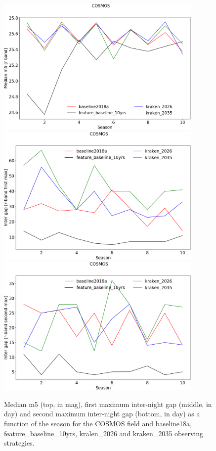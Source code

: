 \begin{figure}[htbp]
\begin{center}
  
  \includegraphics[width=10cm]{Figures/COSMOS_med_m5.png}
  \includegraphics[width=10cm]{Figures/COSMOS_intergap_max1.png}
    \includegraphics[width=10cm]{Figures/COSMOS_intergap_max2.png}
 \caption{Median m5 (top, in mag), first maximum inter-night gap (middle, in day) and second maximum inter-night gap (bottom, in day)  as a function of the season for the COSMOS field and baseline18a, feature\_baseline\_10yrs, kralen\_2026 and kraken\_2035 observing strategies.}\label{fig:cosmos_m5}
\end{center}
\end{figure}

